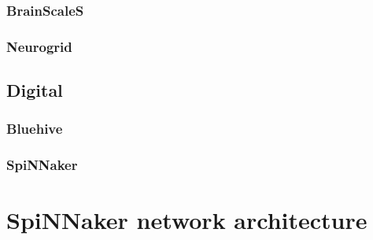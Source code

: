 			\subsubsection{BrainScaleS}
				
			
			\subsubsection{Neurogrid}
				
			
		\subsection{Digital}
			
			
			\subsubsection{Bluehive}
				
			
			\subsubsection{SpiNNaker}
				
	
	
	\section{SpiNNaker network architecture}
		\label{sec:spinnaker}
		
